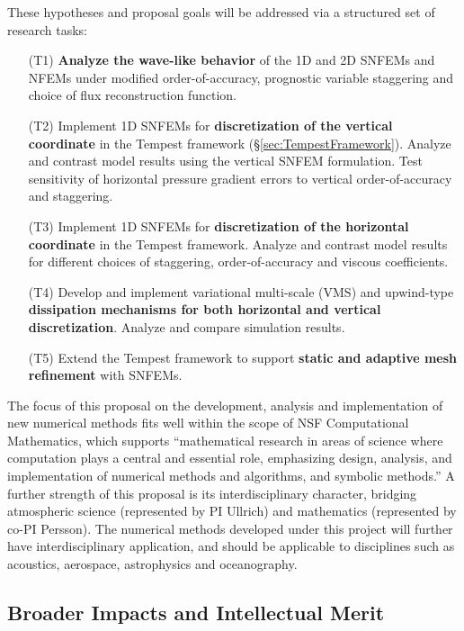 \documentclass[11pt]{article}
\begin{document}
These hypotheses and proposal goals will be addressed via a structured set of research tasks:
\begin{itemize}
\item[(T1)] \textbf{Analyze the wave-like behavior} of the 1D and 2D SNFEMs and NFEMs under modified order-of-accuracy, prognostic variable staggering and choice of flux reconstruction function.

\item[(T2)] Implement 1D SNFEMs for \textbf{discretization of the vertical coordinate} in the Tempest framework (\S \ref{sec:TempestFramework}).  Analyze and contrast model results using the vertical SNFEM formulation.  Test sensitivity of horizontal pressure gradient errors to vertical order-of-accuracy and staggering.

\item[(T3)] Implement 1D SNFEMs for \textbf{discretization of the horizontal coordinate} in the Tempest framework.  Analyze and contrast model results for different choices of staggering, order-of-accuracy and viscous coefficients.

\item[(T4)] Develop and implement variational multi-scale (VMS) and upwind-type \textbf{dissipation mechanisms for both horizontal and vertical discretization}.  Analyze and compare simulation results.

\item[(T5)] Extend the Tempest framework to support \textbf{static and adaptive mesh refinement} with SNFEMs.
\end{itemize}

\vspace{-0.4cm}
The focus of this proposal on the development, analysis and implementation of new numerical methods fits well within the scope of NSF Computational Mathematics, which supports ``mathematical research in areas of science where computation plays a central and essential role, emphasizing design, analysis, and implementation of numerical methods and algorithms, and symbolic methods.''  A further strength of this proposal is its interdisciplinary character, bridging atmospheric science (represented by PI Ullrich) and mathematics (represented by co-PI Persson).  The numerical methods developed under this project will further have interdisciplinary application, and should be applicable to disciplines such as acoustics, aerospace, astrophysics and oceanography.

\subsection{Broader Impacts and Intellectual Merit} \label{sec:BroaderImpacts}
\end{document}
